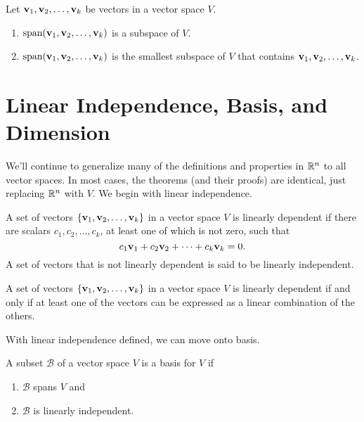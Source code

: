 \documentclass[../m73main.tex]{subfiles}
\begin{document}
\begin{theorem}
	Let $\mathbf{v}_1, \mathbf{v}_2, \ldots, \mathbf{v}_k$ be vectors in a vector space $V$.
	\begin{enumerate}[label=(\alph*)]
		\item $\textrm{span}(\mathbf{v}_1, \mathbf{v}_2, \ldots, \mathbf{v}_k)$ is a subspace of $V$.
		\item $\textrm{span}(\mathbf{v}_1, \mathbf{v}_2, \ldots, \mathbf{v}_k)$ is the smallest subspace of $V$ that contains $\mathbf{v}_1, \mathbf{v}_2, \ldots, \mathbf{v}_k$.
	\end{enumerate}
\end{theorem}

\section{Linear Independence, Basis, and Dimension}
We'll continue to generalize many of the definitions and properties in $\mathbb{R}^n$ to all vector spaces.
In most cases, the theorems (and their proofs) are identical, just replacing $\mathbb{R}^n$ with $V$.
We begin with linear independence.

\begin{definition}
	A set of vectors $\{\mathbf{v}_1, \mathbf{v}_2, \ldots, \mathbf{v}_k\}$ in a vector space $V$ is linearly dependent if there are scalars $c_1, c_2, \ldots, c_k$, at least one of which is not zero, such that
	\[ c_1 \mathbf{v}_1 + c_2 \mathbf{v}_2 + \cdots + c_k \mathbf{v}_k = 0. \]
	A set of vectors that is not linearly dependent is said to be linearly independent.
\end{definition}

\begin{theorem}
	A set of vectors $\{\mathbf{v}_1, \mathbf{v}_2, \ldots, \mathbf{v}_k\}$ in a vector space $V$ is linearly dependent if and only if at least one of the vectors can be expressed as a linear combination of the others.
\end{theorem}

With linear independence defined, we can move onto basis.

\begin{definition}[Basis]
	A subset $\mathcal{B}$ of a vector space $V$ is a basis for $V$ if
	\begin{enumerate}
		\item $\mathcal{B}$ spans $V$ and
		\item $\mathcal{B}$ is linearly independent.
	\end{enumerate}
\end{definition}
\end{document}

